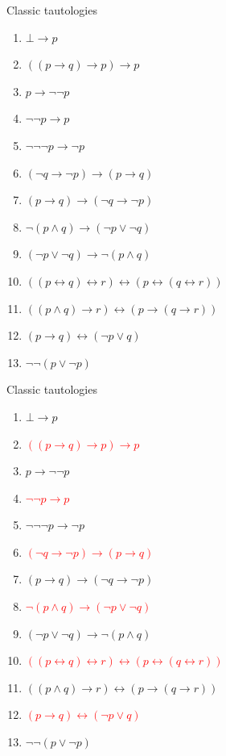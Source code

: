\documentclass[sans]{beamer}
\begin{document}
\begin{frame}{Classic tautologies}
   \begin{enumerate}
     \item $\bot \to p$
     \item $((p \to q) \to p) \to p$
     \item $p \to \lnot \lnot p$
     \item $\lnot \lnot p \to p$
     \item $\lnot \lnot \lnot p \to \lnot p$
     \item $(\lnot q \to \lnot p) \to (p \to q)$
     \item $(p \to q) \to (\lnot q \to \lnot p)$
     \item $\lnot (p \wedge q) \to (\lnot p \vee \lnot q)$
     \item $(\lnot p \vee \lnot q) \to \lnot (p \wedge q)$
     \item $((p \leftrightarrow q) \leftrightarrow r) \leftrightarrow (p \leftrightarrow (q \leftrightarrow r))$
     \item $((p \wedge q) \to r) \leftrightarrow (p \to (q \to r))$
     \item $(p \to q) \leftrightarrow (\lnot p \vee q)$
     \item $\lnot\lnot (p \vee \lnot p)$
   \end{enumerate}
\end{frame}

\begin{frame}{Classic tautologies}
   \begin{enumerate}
     \item $\bot \to p$
     \item \textcolor{red}{$((p \to q) \to p) \to p$}
     \item $p \to \lnot \lnot p$
     \item \textcolor{red}{$\lnot \lnot p \to p$}
     \item $\lnot \lnot \lnot p \to \lnot p$
     \item \textcolor{red}{$(\lnot q \to \lnot p) \to (p \to q)$}
     \item $(p \to q) \to (\lnot q \to \lnot p)$
     \item \textcolor{red}{$\lnot (p \wedge q) \to (\lnot p \vee \lnot q)$}
     \item $(\lnot p \vee \lnot q) \to \lnot (p \wedge q)$
     \item \textcolor{red}{$((p \leftrightarrow q) \leftrightarrow r) \leftrightarrow (p \leftrightarrow (q \leftrightarrow r))$}
     \item $((p \wedge q) \to r) \leftrightarrow (p \to (q \to r))$
     \item \textcolor{red}{$(p \to q) \leftrightarrow (\lnot p \vee q)$}
     \item $\lnot\lnot (p \vee \lnot p)$
   \end{enumerate}
\end{frame}
\end{document}
